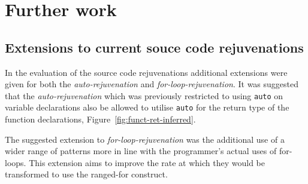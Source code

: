 \documentclass[bsc,frontabs,singlespacing,twoside,parskip,deptreport]{infthesis}
\begin{document}

\section{Further work}

\subsection{Extensions to current souce code rejuvenations}
In the evaluation of the source code rejuvenations additional extensions were given for both the \textit{auto-rejuvenation} and  \textit{for-loop-rejuvenation}. It was suggested that the \textit{auto-rejuvenation} which was previously restricted to using \texttt{auto} on variable declarations also be allowed to utilise \texttt{auto} for the return type of the function declarations, Figure~\ref{fig:funct-ret-inferred}.

The suggested extension to \textit{for-loop-rejuvenation} was the additional use of a wider range of patterns more in line with the programmer's actual uses of for-loops. This extension aims to improve the rate at which they would be transformed to use the ranged-for construct.


\end{document}
